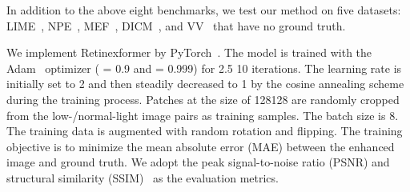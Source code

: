 \documentclass[10pt,twocolumn,letterpaper]{article}
\begin{document}
In addition to the above eight benchmarks, we test our method on five datasets: LIME~\cite{lime}, NPE~\cite{retinex_6}, MEF~\cite{mef}, DICM~\cite{he_4}, and VV~\cite{vv} that have no ground truth.

 We implement Retinexformer by PyTorch~\cite{pytorch}. The model is trained with the Adam~\cite{adam} optimizer ( = 0.9 and  = 0.999) for 2.5  10 iterations. The learning rate is initially set to 2 and then steadily decreased to 1 by the cosine annealing scheme~\cite{sgdr} during the training process. Patches at the size of 128128 are randomly cropped from the low-/normal-light image pairs as training samples. The batch size is 8. The training data is augmented with random rotation and flipping. The training objective is to minimize the mean absolute error (MAE) between the enhanced image and ground truth. We adopt the peak signal-to-noise ratio (PSNR) and structural similarity (SSIM)~\cite{ssim} as the evaluation metrics.

\begin{table}[h]
	\begin{center}
		\vspace{1.5mm}
		\vspace{2.5mm}
		\caption{\small Results on the FiveK~\cite{fivek} dataset with sRGB output mode.}
		\label{tab:adobe_5k}
	\end{center}\vspace{-8.5mm}
\end{table}
\end{document}
